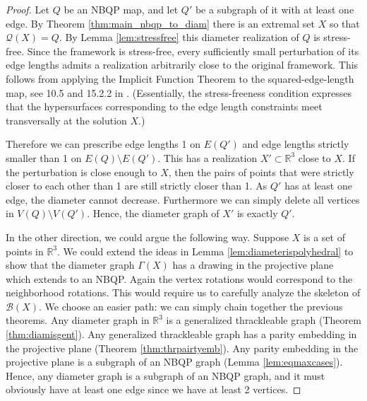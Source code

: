 \documentclass[10pt,a4paper]{article}
\newcommand{\R}[0]{\mathbb{R}}
\newcommand{\Bc}[0]{\mathcal{B}}
\newcommand{\qt}{\mathcal{Q}}
\begin{document}
\begin{proof}
    Let $Q$ be an NBQP map, and let $Q'$ be a subgraph of it with at least one edge. By Theorem \ref{thm:main_nbqp_to_diam} there is an extremal set $X$ so that $\qt(X)=Q$. By Lemma \ref{lem:stressfree} this diameter realization of $Q$ is stress-free. Since the framework is stress-free, every sufficiently small perturbation of its edge lengths admits a realization arbitrarily close to the original framework.  This follows from applying the Implicit Function Theorem to the squared-edge-length map, see 10.5 and 15.2.2 in \cite{lovasz2019graphs}. (Essentially, the stress-freeness condition expresses that the hypersurfaces corresponding to the edge length constraints meet transversally at the solution $X$.) 

    Therefore we can prescribe edge lengths 1 on $E(Q')$ and edge lengths strictly smaller than 1 on $E(Q)\setminus E(Q')$. This has a realization $X'\subset \R^3$ close to $X$.  If the perturbation is close enough to $X$, then the pairs of points that were strictly closer to each other than 1 are still strictly closer than 1. As $Q'$ has at least one edge, the diameter cannot decrease. Furthermore we can simply delete all vertices in $V(Q)\setminus V(Q')$. Hence, the diameter graph of $X'$ is exactly $Q'$. 

    In the other direction, we could argue the following way. Suppose $X$ is a set of points in $\R^3$. We could extend the ideas in Lemma \ref{lem:diameterispolyhedral} to show that the diameter graph $\Gamma(X)$ has a drawing in the projective plane which extends to an NBQP. Again the vertex rotations would correspond to the neighborhood rotations. This would require us to carefully analyze the skeleton of $\Bc(X)$. We choose an easier path: we can simply chain together the previous theorems. Any diameter graph in $\R^3$ is a generalized thrackleable graph (Theorem \ref{thm:diamisgent}). Any generalized thrackleable graph has a parity embedding in the projective plane (Theorem \ref{thm:thrpairtyemb}). Any parity embedding in the projective plane is a subgraph of an NBQP graph (Lemma \ref{lem:eqmaxcases}).  Hence, any diameter graph is a subgraph of an NBQP graph, and it must obviously have at least one edge since we have at least 2 vertices. 
       
\end{proof}
\end{document}
